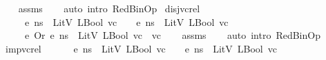 \begin{isabellebody}
%
\isadelimproof
\ \ %
\endisadelimproof
%
\isatagproof
{}\isamarkupfalse%
\ assms\isanewline
\ \ \isamarkupfalse%
\ {\isacharparenleft}{\kern0pt}auto\ intro{\isacharcolon}{\kern0pt}\ RedBinOp{\isacharparenright}{\kern0pt}%
\endisatagproof
{\isafoldproof}%
%
\isadelimproof
\isanewline
%
\endisadelimproof
\isanewline
{}\isamarkupfalse%
\ disj{\isacharunderscore}{\kern0pt}vc{\isacharunderscore}{\kern0pt}rel{\isacharcolon}{\kern0pt}\ \isanewline
\ \ \ {\isachardoublequoteopen}{\isasymLambda}{\isacharcomma}{\kern0pt}{\isasymGamma}{\isacharcomma}{\kern0pt}{\isasymOmega}\ {\isasymturnstile}\ {\isasymlangle}e{}{\isacharcomma}{\kern0pt}\ ns{\isasymrangle}\ {\isasymDown}\ LitV\ {\isacharparenleft}{\kern0pt}LBool\ vc{}{\isacharparenright}{\kern0pt}{\isachardoublequoteclose}\ \ {\isachardoublequoteopen}{\isasymLambda}{\isacharcomma}{\kern0pt}{\isasymGamma}{\isacharcomma}{\kern0pt}{\isasymOmega}\ {\isasymturnstile}\ {\isasymlangle}e{}{\isacharcomma}{\kern0pt}\ ns{\isasymrangle}\ {\isasymDown}\ LitV\ {\isacharparenleft}{\kern0pt}LBool\ vc{}{\isacharparenright}{\kern0pt}{\isachardoublequoteclose}\isanewline
\ \ \ {\isachardoublequoteopen}{\isasymLambda}{\isacharcomma}{\kern0pt}{\isasymGamma}{\isacharcomma}{\kern0pt}{\isasymOmega}\ {\isasymturnstile}\ {\isasymlangle}e{}\ {\isasymguillemotleft}Or{\isasymguillemotright}\ e{}{\isacharcomma}{\kern0pt}\ ns{\isasymrangle}\ {\isasymDown}\ LitV\ {\isacharparenleft}{\kern0pt}LBool\ {\isacharparenleft}{\kern0pt}vc{}\ {\isasymor}\ vc{}{\isacharparenright}{\kern0pt}{\isacharparenright}{\kern0pt}{\isachardoublequoteclose}\isanewline
%
\isadelimproof
\ \ %
\endisadelimproof
%
\isatagproof
{}\isamarkupfalse%
\ assms\isanewline
\ \ \isamarkupfalse%
\ {\isacharparenleft}{\kern0pt}auto\ intro{\isacharcolon}{\kern0pt}\ RedBinOp{\isacharparenright}{\kern0pt}%
\endisatagproof
{\isafoldproof}%
%
\isadelimproof
\isanewline
%
\endisadelimproof
\isanewline
{}\isamarkupfalse%
\ imp{\isacharunderscore}{\kern0pt}vc{\isacharunderscore}{\kern0pt}rel{\isacharcolon}{\kern0pt}\ \isanewline
\ \ \ {\isachardoublequoteopen}{\isasymLambda}{\isacharcomma}{\kern0pt}{\isasymGamma}{\isacharcomma}{\kern0pt}{\isasymOmega}\ {\isasymturnstile}\ {\isasymlangle}e{}{\isacharcomma}{\kern0pt}\ ns{\isasymrangle}\ {\isasymDown}\ LitV\ {\isacharparenleft}{\kern0pt}LBool\ vc{}{\isacharparenright}{\kern0pt}{\isachardoublequoteclose}\ \ {\isachardoublequoteopen}{\isasymLambda}{\isacharcomma}{\kern0pt}{\isasymGamma}{\isacharcomma}{\kern0pt}{\isasymOmega}\ {\isasymturnstile}\ {\isasymlangle}e{}{\isacharcomma}{\kern0pt}\ ns{\isasymrangle}\ {\isasymDown}\ LitV\ {\isacharparenleft}{\kern0pt}LBool\ vc{}{\isacharparenright}{\kern0pt}{\isachardoublequoteclose}\isanewline

\end{isabellebody}
